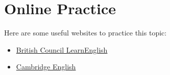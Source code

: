 \section{Online Practice}
Here are some useful websites to practice this topic:
\begin{itemize}
    \item \href{https://learnenglish.britishcouncil.org/business-english/vocabulary}{British Council LearnEnglish}
    \item \href{https://www.cambridgeenglish.org/learning-english/activities-for-learners/?skill=reading&level=independent&rows=12}{Cambridge English}
\end{itemize}
